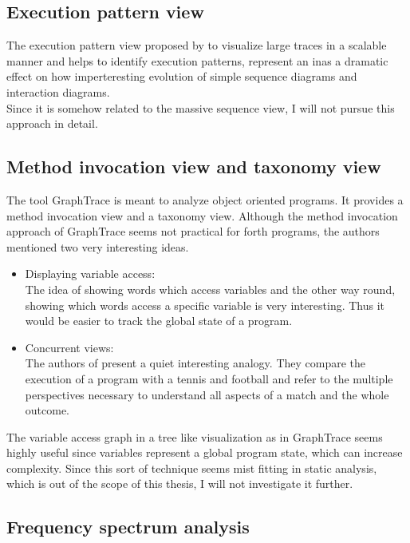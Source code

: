 \subsection*{Execution pattern view}
The execution pattern view proposed by \cite{Pauw98executionpatterns} to visualize large traces in a scalable manner and helps to identify execution patterns, represent an inas a dramatic effect on how imperteresting evolution of simple sequence diagrams and interaction diagrams.
\\
Since it is somehow related to the massive sequence view, I will not pursue this approach in detail.

\subsection*{Method invocation view and taxonomy view}
The tool \gls{GraphTrace}\cite{Kleyn:1988:GOS:62084.62101} is meant to analyze object oriented programs. It provides a method invocation view and a taxonomy view. Although the method invocation approach of GraphTrace seems not practical for forth programs, the authors mentioned two very interesting ideas.
\begin{itemize}
\item Displaying variable access:\\
	The idea of showing words which access variables and the other way round, showing which words access a specific variable is very interesting. Thus it would be easier to track the global state of a program.
\item Concurrent views:\\
	The authors of \cite{Kleyn:1988:GOS:62084.62101} present a quiet interesting analogy. They compare the execution of a program with a tennis and football and refer to the multiple perspectives necessary to understand all aspects of a match and the whole outcome.
\end{itemize}

The variable access graph in a tree like visualization as in GraphTrace seems highly useful since variables represent a global program state, which can increase complexity. Since this sort of technique seems mist fitting in static analysis, which is out of the scope of this thesis, I will not investigate it further.

\subsection*{Frequency spectrum analysis}


